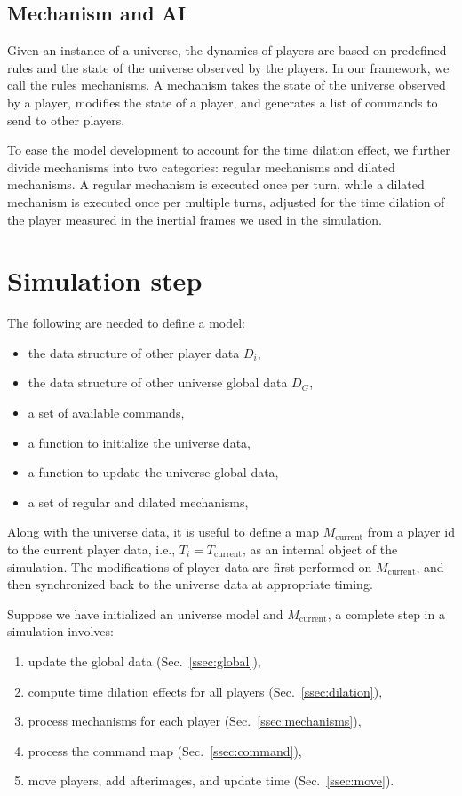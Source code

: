 \documentclass{svproc}
\begin{document}
\subsection{Mechanism and AI} \label{ssec:mechanism_and_ai}

Given an instance of a universe, 
the dynamics of players are based on predefined rules and the state of the universe observed by the players.
In our framework, we call the rules mechanisms.
A mechanism takes the state of the universe observed by a player,
modifies the state of a player,
and generates a list of commands to send to other players.

To ease the model development to account for the time dilation effect, 
we further divide mechanisms into two categories: regular mechanisms and dilated mechanisms. 
A regular mechanism is executed once per turn, 
while a dilated mechanism is executed once per multiple turns, 
adjusted for the time dilation of the player measured in the inertial frames we used in the simulation.

\section{Simulation step} \label{sec:simulation}

The following are needed to define a model:
\begin{itemize}
  \item the data structure of other player data $D_i$,
  \item the data structure of other universe global data $D_G$,
  \item a set of available commands,
  \item a function to initialize the universe data,
  \item a function to update the universe global data,
  \item a set of regular and dilated mechanisms,
\end{itemize}

Along with the universe data,
it is useful to define a map $M_{\textrm{current}}$ from a player id to the current player data, 
i.e., $T_i = T_{\textrm{current}}$,
as an internal object of the simulation.
The modifications of player data are first performed on $M_\textrm{current}$, 
and then synchronized back to the universe data at appropriate timing.

Suppose we have initialized an universe model and $M_\textrm{current}$, a complete step in a simulation involves:
\begin{enumerate}
  \item update the global data (Sec.~\ref{ssec:global}),
  \item compute time dilation effects for all players (Sec.~\ref{ssec:dilation}),
  \item process mechanisms for each player (Sec.~\ref{ssec:mechanisms}),
  \item process the command map (Sec.~\ref{ssec:command}),
  \item move players, add afterimages, and update time (Sec.~\ref{ssec:move}).
\end{enumerate}
\end{document}
